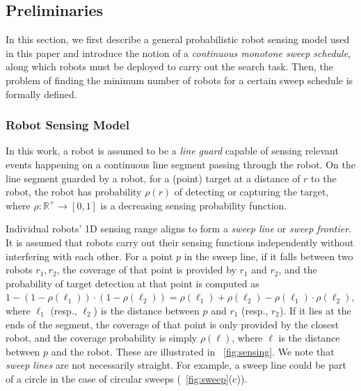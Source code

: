 
\subsection{Preliminaries}

In this section, we first describe a general probabilistic robot sensing model 
used in this paper and introduce the notion of a \emph{continuous monotone 
sweep schedule}, along which robots must be deployed to carry out the 
search task. 
%
Then, the problem of finding the minimum number of robots for a certain 
sweep schedule is formally defined.

\subsubsection{Robot Sensing Model}
\label{sec:sensing}

In this work, a robot is assumed to be a \emph{line guard} capable of sensing 
relevant events happening on a continuous line segment passing through the
robot. 
%
On the line segment guarded by a robot, for a (point) target at a distance 
of $r$ to the robot, the robot has probability $\rho(r)$ of 
detecting or capturing the target, where $\rho: \mathbb{R}^+\rightarrow[0,1]$ 
is a decreasing sensing probability function. 
%

Individual robots' 1D sensing range aligns to form a \emph{sweep line} or \emph{sweep frontier}.
%
It is assumed that robots carry out their sensing functions independently 
without interfering with each other.
%
For a point $p$ in the sweep line, if it falls between two robots $r_1, 
r_2$, the coverage of that point is provided by $r_1$ and $r_2$, and the 
probability of target detection at that point is computed as $1-(1-\rho(\ell_1))\cdot(1-\rho(\ell_2))=\rho(\ell_1) + \rho(\ell_2) - \rho(\ell_1) \cdot \rho(\ell_2)$, where $\ell_1$ (resp., $\ell_2$) is the distance between $p$ and $r_1$ (resp., $r_2$).
%
If it lies at the ends of the segment, the coverage of that point is only provided by the closest robot, and the coverage probability is simply $\rho(\ell)$, where $\ell$ is the distance between $p$ and the robot. These are illustrated in ~\ref{fig:sensing}.
%
We note that \emph{sweep lines} are not necessarily straight. For example, a sweep line could be part of a circle in the case of circular sweeps (~\ref{fig:sweep}(c)).

